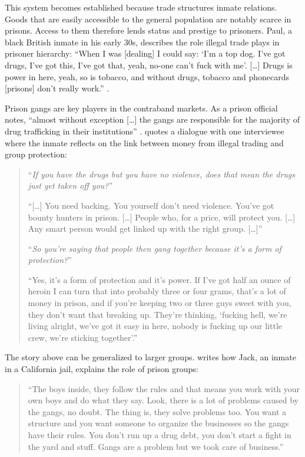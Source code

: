 \documentclass[a4paper, 12pt]{article}
\begin{document}
This system becomes established because trade structures inmate relations. Goods that are easily accessible to the general population are notably scarce in prisons. Access to them therefore lends status and prestige to prisoners. Paul, a black British inmate in his early 30s, describes the role illegal trade plays in prisoner hierarchy: ``When I was [dealing] I could say: `I'm a top dog. I've got drugs, I've got this, I've got that, yeah, no-one can't fuck with me'. [\dots] Drugs is power in here, yeah, so is tobacco, and without drugs, tobacco and phonecards [prisons] don't really work.'' \citep[p. 360--361]{crewe2006prison}. 

Prison gangs are key players in the contraband markets. As a prison official notes, ``almost without exception [\dots] the gangs are responsible for the majority of drug trafficking in their institutions'' \citep[p. 52]{camp1985prison}. \citet[p. 361--362]{crewe2006prison} quotes a dialogue with one interviewee where the inmate reflects on the link between money from illegal trading and group protection:

\begin{quote}
``\textit{If you have the drugs but you have no violence, does that mean the drugs just get taken off you?}''

``[\dots] You need backing. You yourself don't need violence. You've got bounty hunters in prison. [\dots] People who, for a price, will protect you. [\dots] Any smart person would get linked up with the right group. [\dots]''

``\textit{So you're saying that people then gang together because it's a form of protection?}''

``Yes, it's a form of protection and it's power. If I've got half an ounce of heroin I can turn that into probably three or four grams, that's a lot of money in prison, and if you're keeping two or three guys sweet with you, they don't want that breaking up. They're thinking, `fucking hell, we're living alright, we've got it easy in here, nobody is fucking up our little crew, we're sticking together'.''
\end{quote}

The story above can be generalized to larger groups. \citet[p. 755]{trammell2009values} writes how Jack, an inmate in a California jail, explains the role of prison groups:

\begin{quote}
``The boys inside, they follow the rules and that means you work with your own boys and do what they say. Look, there is a lot of problems caused by the gangs, no doubt. The thing is, they solve problems too. You want a structure and you want someone to organize the businesses so the gangs have their rules. You don't run up a drug debt, you don't start a fight in the yard and stuff. Gangs are a problem but we took care of business.''
\end{quote}
\end{document}
